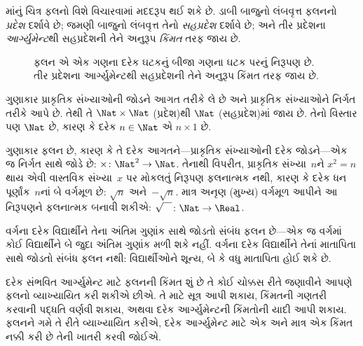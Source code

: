 માંનું ચિત્ર ફલનો વિશે વિચારવામાં મદદરૂપ
થઈ શકે છે. ડાબી બાજુનો લંબવૃત્ત ફલનનો \emph{પ્રદેશ}
દર્શાવે છે; જમણી બાજુનો લંબવૃત્ત તેનો \emph{સહપ્રદેશ}
દર્શાવે છે; અને તીર પ્રદેશના \emph{આર્ગ્યુમેન્ટ}થી સહપ્રદેશની
તેને અનુરૂપ \emph{કિંમત} તરફ જાય છે.

\begin{figure}
  \caption{ફલન એ એક ગણના દરેક ઘટકનું બીજા ગણના
    ઘટક પરનું નિરૂપણ છે. તીર પ્રદેશના આર્ગ્યુમેન્ટથી
    સહપ્રદેશની તેને અનુરૂપ કિંમત તરફ જાય છે.}
\end{figure}

\begin{ex}
ગુણાકાર પ્રાકૃતિક સંખ્યાઓની જોડને આગત તરીકે લે છે અને
પ્રાકૃતિક સંખ્યાઓને નિર્ગત તરીકે આપે છે. તેથી તે
$\Nat \times \Nat$ (પ્રદેશ)થી $\Nat$ (સહપ્રદેશ)માં જાય છે.
તેનો વિસ્તાર પણ $\Nat$ છે, કારણ કે દરેક $n \in \Nat$
એ $n \times 1$ છે.
\end{ex}

\begin{ex}
ગુણાકાર ફલન છે, કારણ કે તે દરેક આગતને---પ્રાકૃતિક સંખ્યાઓની
દરેક જોડને---એક જ નિર્ગત સાથે જોડે છે:
$\times \colon \Nat^2 \to
\Nat$. તેનાથી વિપરીત, પ્રાકૃતિક સંખ્યા~$n$ને
$x^2 = n$ થાય એવી વાસ્તવિક સંખ્યા~$x$ પર મોકલતું નિરૂપણ
ફલનાત્મક નથી, કારણ કે દરેક ધન પૂર્ણાંક~$n$નાં બે વર્ગમૂળ
છે: $\sqrt{n}$ અને~$-\sqrt{n}$. માત્ર અનૃણ (મુખ્ય) વર્ગમૂળ આપીને
આ નિરૂપણને ફલનાત્મક બનાવી શકીએ:
$\sqrt{\phantom{X}} \colon
\Nat \to \Real$.
\end{ex}

\begin{ex}
વર્ગના દરેક વિદ્યાર્થીને તેના અંતિમ ગુણાંક સાથે જોડતો સંબંધ
ફલન છે---એક જ વર્ગમાં કોઈ વિદ્યાર્થીને બે જુદા અંતિમ
ગુણાંક મળી શકે નહીં. વર્ગના દરેક વિદ્યાર્થીને તેનાં
માતાપિતા સાથે જોડતો સંબંધ ફલન નથી: વિદ્યાર્થીઓને
શૂન્ય, બે કે વધુ માતાપિતા હોઈ શકે છે.
\end{ex}

\begin{explain}
દરેક સંભવિત આર્ગ્યુમેન્ટ માટે ફલનની કિંમત શું છે તે કોઈ ચોક્કસ
રીતે જણાવીને આપણે ફલનો વ્યાખ્યાયિત કરી શકીએ છીએ.
તે માટે સૂત્ર આપી શકાય, કિંમતની ગણતરી કરવાની પદ્ધતિ
વર્ણવી શકાય, અથવા દરેક આર્ગ્યુમેન્ટની કિંમતોની યાદી આપી શકાય.
ફલનને ગમે તે રીતે વ્યાખ્યાયિત કરીએ, દરેક આર્ગ્યુમેન્ટ માટે
એક અને માત્ર એક કિંમત નક્કી કરી છે તેની ખાતરી કરવી જોઈએ.
\end{explain}

